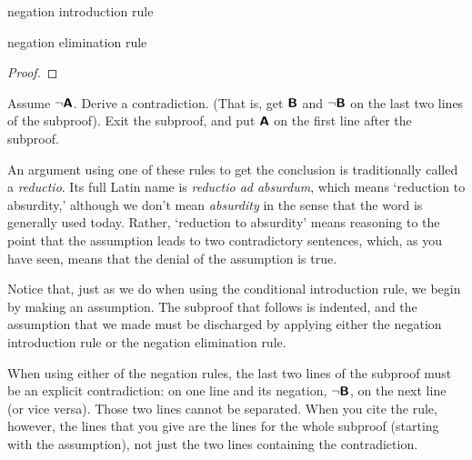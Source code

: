 {{{{{{{{{\begin{factboxy}{negation introduction rule}
\end{factboxy}

\begin{factboxy}{negation elimination rule}
\begin{proof}
\open
	\as{}
\close
{}
\end{proof}

\small{Assume ${\neg}\bm{\mathsf{A}}$. Derive a contradiction. (That is, get $\bm{\mathsf{B}}$ and ${\neg}\bm{\mathsf{B}}$ on the last two lines of the subproof). Exit the subproof, and put $\bm{\mathsf{A}}$ on the first line after the subproof.}

\end{factboxy}


\begin{notebox}
An argument using one of these rules to get the conclusion is traditionally called a \emph{reductio}. Its full Latin name is \emph{reductio ad absurdum}, which means `reduction to absurdity,' although we don't mean \textit{absurdity} in the sense that the word is generally used today. Rather, `reduction to absurdity' means reasoning to the point that the assumption leads to two contradictory sentences, which, as you have seen, means that the denial of the assumption is true. 
\end{notebox}\smallskip

Notice that, just as we do when using the conditional introduction rule, we begin by making an assumption. The subproof that follows is indented, and the assumption that we made must be discharged by applying either the negation introduction rule or the negation elimination rule. 

When using either of the negation rules, the last two lines of the subproof must be an explicit contradiction:  on one line and its negation, ${\neg}\bm{\mathsf{B}}$, on the next line (or vice versa). Those two lines cannot be separated. When you cite the rule, however, the lines that you give are the lines for the whole subproof (starting with the assumption), not just the two lines containing the contradiction. 


}}}}}}}}}
